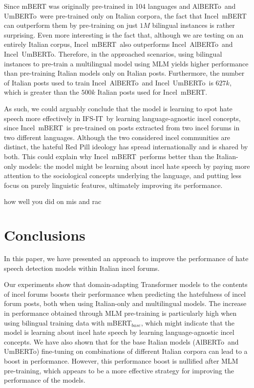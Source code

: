 \documentclass[11pt]{article}
\newcommand{\abc}[1]{{\color{blue} #1}}
\newcommand{\dsITclassification}{IFS-IT}
\newcommand{\mbert}{\mbox{mBERT$_{base}$}}
\newcommand{\imbert}{\mbox{Incel mBERT}}
\newcommand{\umbert}{\mbox{UmBERTo}}
\newcommand{\albert}{\mbox{AlBERTo}}
\newcommand{\iumbert}{\mbox{Incel UmBERTo}}
\newcommand{\ialbert}{\mbox{Incel AlBERTo}}
\begin{document}
Since mBERT was originally pre-trained in 104 languages and \albert\, and \umbert\, were pre-trained only on Italian corpora, the fact that \imbert\, can outperform them by pre-training on just $1M$ bilingual instances is rather surprising. Even more interesting is the fact that, although we are testing on an entirely Italian corpus, \imbert\, also outperforms \ialbert\, and \iumbert. Therefore, in the approached scenarios, using bilingual instances to pre-train a multilingual model using MLM yields higher performance than pre-training Italian models only on Italian posts. Furthermore, the number of Italian posts used to train \ialbert\, and \iumbert\, is $627k$, which is greater than the $500k$ Italian posts used for \imbert.

As such, we could arguably conclude that the model is learning to spot hate speech more effectively in \dsITclassification\, by learning language-agnostic incel concepts, since \imbert\, is pre-trained on posts extracted from two incel forums in two different languages. Although the two considered incel communities are distinct, the hateful Red Pill ideology has spread internationally and is shared by both. This could explain why \imbert\, performs better than the Italian-only models: the model might be learning about incel hate speech by paying more attention to the sociological concepts underlying the language, and putting less focus on purely linguistic features, ultimately improving its performance.
\medskip


\abc{how well you did on mis and rac}
\section{Conclusions}

In this paper, we have presented an approach to improve the performance of hate speech detection models within Italian incel forums.

Our experiments show that domain-adapting Transformer models to the contents of incel forums boosts their performance when predicting the hatefulness of incel forum posts, both when using Italian-only and multilingual models. The increase in performance obtained through MLM pre-training is particularly high when using bilingual training data with \mbert, which might indicate that the model is learning about incel hate speech by learning language-agnostic incel concepts.
We have also shown that for the base Italian models (\albert\, and \umbert) fine-tuning on combinations of different Italian corpora can lead to a boost in performance. However, this performance boost is nullified after MLM pre-training, which appears to be a more effective strategy for improving the performance of the models.
\end{document}
